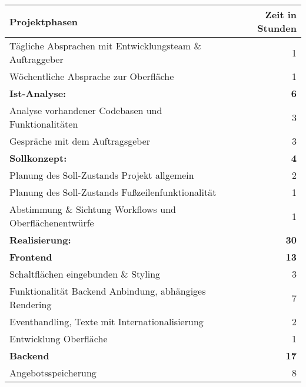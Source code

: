 \begin{tabular}{|l|r|}
	\hline
	\rowcolor{blue!70}\textbf{Projektphasen }                                  & \textbf{Zeit in Stunden} \\ \hline
	\rowcolor{blue!10}Tägliche Absprachen mit Entwicklungsteam \& Auftraggeber &                        1 \\
	\rowcolor{blue!10}Wöchentliche Absprache zur Oberfläche                    &                        1 \\
	\rowcolor{blue!50}\textbf{Ist-Analyse: }                                   &               \textbf{6} \\
	\rowcolor{blue!10}Analyse vorhandener Codebasen und Funktionalitäten       &                        3 \\
	\rowcolor{blue!10}Gespräche mit dem Auftragsgeber                          &                        3 \\
	\rowcolor{blue!50}\textbf{Sollkonzept:  }                                  &               \textbf{4} \\
	\rowcolor{blue!10}Planung des Soll-Zustands Projekt allgemein              &                        2 \\
	\rowcolor{blue!10}Planung des Soll-Zustands Fußzeilenfunktionalität        &                        1 \\
	\rowcolor{blue!10}Abstimmung \& Sichtung Workflows und Oberflächenentwürfe &                        1 \\
	\rowcolor{blue!50}\textbf{Realisierung: }                                  &              \textbf{30} \\
	\rowcolor{blue!30}\textbf{Frontend  }                                      &              \textbf{13} \\
	\rowcolor{blue!10}Schaltflächen eingebunden \& Styling                     &                        3 \\
	\rowcolor{blue!10}Funktionalität Backend Anbindung, abhängiges Rendering   &                        7 \\
	\rowcolor{blue!10}Eventhandling, Texte mit Internationalisierung           &                        2 \\
	\rowcolor{blue!10}Entwicklung Oberfläche                                   &                        1 \\
	\rowcolor{blue!30}\textbf{Backend  }                                       &             \textbf{ 17} \\
	\rowcolor{blue!10}Angebotsspeicherung                                      &                        8 \\

\end{tabular}
